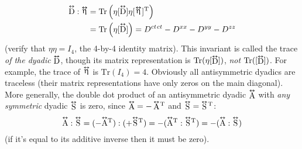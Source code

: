 \documentclass[12pt]{article}
\newcommand{\tightoverset}[2]{%
  \mathop{#2}\limits^{\vbox to -.5ex{\kern-0.75ex\hbox{$#1$}\vss}}}
\newcommand{\inlinedy}[1]{\tightoverset{\text{\tiny$\bm\leftrightarrow$}}{#1}}
\newcommand{\capdy}[1]{ \overset{ \text{\tiny$\bm\leftrightarrow$} }{\vphantom{\text{\small{A}}}\smash{#1}} }
\begin{document}
\begin{equation*}
\begin{split}
\capdy{\mathrm{D}} : \inlinedy{\upeta} &= \mathrm{Tr} \left( \eta [\capdy{\mathrm{D}}] \eta [ \mkern1mu \inlinedy{\upeta} \mkern.5mu ]^{\mathrm{T}} \right) \\
&= \mathrm{Tr} \left( \eta [\capdy{\mathrm{D}}] \right) = D^{ct \mkern1.5mu ct} - D^{xx} - D^{yy} - D^{zz}
\end{split}
\end{equation*}
(verify that $\eta \eta = I_4$, the 4-by-4 identity matrix). This invariant is called the trace \emph{of the dyadic} $\inlinedy{\mathrm{D}}$, though its matrix representation is $\mathrm{Tr} (\eta [ \inlinedy{\mathrm{D}} ])$, \emph{not} $\mathrm{Tr} ( [ \inlinedy{\mathrm{D}} ] )$. For example, the trace of $\inlinedy{\upeta}$ is $\mathrm{Tr} (I_4) = 4$. Obviously all antisymmetric dyadics are traceless (their matrix representations have only zeros on the main diagonal). More generally, the double dot product of an antisymmetric dyadic $\inlinedy{\mathrm{A}}$ with \emph{any symmetric} dyadic $\inlinedy{\mathrm{S}}$ is zero, since $\inlinedy{\mathrm{A}} = - \inlinedy{\mathrm{A}} \mkern-2mu ^\mathrm{T}$ and $\inlinedy{\mathrm{S}} = \inlinedy{\mathrm{S}} \mkern-2mu^\mathrm{T}$:
\begin{equation*}
\capdy{\mathrm{A}} : \capdy{\mathrm{S}} = ( - \capdy{\mathrm{A}} \mkern0mu ^\mathrm{T} ) : ( + \capdy{\mathrm{S}} \mkern0mu ^\mathrm{T} ) = - ( \capdy{\mathrm{A}} \mkern0mu ^\mathrm{T} : \capdy{\mathrm{S}} \mkern0mu ^\mathrm{T} ) = - ( \capdy{\mathrm{A}} : \capdy{\mathrm{S}} )
\end{equation*}
(if it's equal to its additive inverse then it must be zero).
\end{document}
